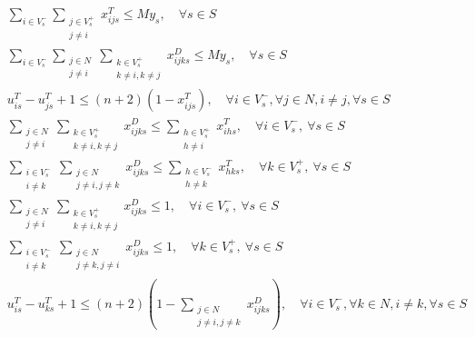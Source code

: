 \documentclass[fontset=none]{ctexart}
\begin{document}
\begin{theorem}
{\begin{align}
    & \sum_{i \in V_s^-}\sum_{\substack{j \in V_s^+ \\ j \neq i}} x_{ijs}^T \leq M y_s, \quad \forall s \in S \label{eq:conv-level-2-truck-store}\\
    & \sum_{i \in V_s^-}\sum_{\substack{j \in N \\ j \neq i}}\sum_{\substack{k \in V_s^+ \\ k \neq i, k \neq j}} x_{ijks}^D \leq M y_s, \quad \forall s \in S \label{eq:conv-level-2-drone-store}\\
	& u_{is}^T - u_{js}^T + 1 \leq (n + 2)\left(1 - x_{ijs}^T\right), \quad \forall i \in V_s^-, \forall j \in N, i \neq j, \forall s \in S \label{eq:conv-level-2-subtour}\\
    & \sum_{\substack{j \in N \\ j \neq i}}\sum_{\substack{k \in V_s^+ \\ k \neq i, k \neq j}} x_{ijks}^D \leq \sum_{\substack{h \in V_s^+ \\ h \neq i}} x_{ihs}^T, \quad \forall i \in V_s^-,\ \forall s \in S \label{eq:conv-level-2-truck-drone-takeoff}\\
    & \sum_{\substack{i \in V_s^- \\ i \neq k}}\sum_{\substack{j \in N \\ j \neq i, j \neq k}} x_{ijks}^D \leq \sum_{\substack{h \in V_s^- \\ h \neq k}} x_{hks}^T, \quad \forall k \in V_s^+,\ \forall s \in S \label{eq:conv-level-2-truck-drone-landing}\\
	& \sum_{\substack{j \in N\\ j \neq i}}\sum_{\substack{k \in V_s^+\\ k \neq i, k \neq j}}x_{ijks}^D \leq 1, \quad \forall i \in V_s^-, \ \forall s \in S \label{eq:conv-level-2-drone-takeoff}\\
	& \sum_{\substack{i \in V_s^-\\ i \neq k}}\sum_{\substack{j \in N\\ j \neq k, j \neq i}}x_{ijks}^D \leq 1, \quad \forall k \in V_s^+, \ \forall s \in S \label{eq:conv-level-2-drone-landing}\\
 	& u_{is}^T - u_{ks}^T + 1 \leq \left(n + 2\right)\left(1 - \sum_{\substack{j \in N\\ j \neq i, j \neq k}}x_{ijks}^D\right), \quad \forall i \in V_s^-, \forall k \in N, i \neq k, \forall s \in S \label{eq:conv-level-2-drone-service-order}\\

\end{align}}
\end{theorem}
\end{document}
